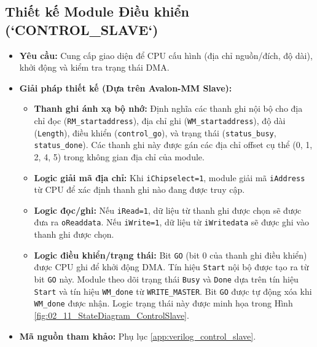 \subsection{Thiết kế Module Điều khiển (`CONTROL\_SLAVE`)}
\begin{itemize}
    \item \textbf{Yêu cầu:} Cung cấp giao diện để CPU cấu hình (địa chỉ nguồn/đích, độ dài), khởi động và kiểm tra trạng thái DMA.
    \item \textbf{Giải pháp thiết kế (Dựa trên Avalon-MM Slave):}
        \begin{itemize}
            \item \textbf{Thanh ghi ánh xạ bộ nhớ:} Định nghĩa các thanh ghi nội bộ cho địa chỉ đọc (\texttt{RM\_startaddress}), địa chỉ ghi (\texttt{WM\_startaddress}), độ dài (\texttt{Length}), điều khiển (\texttt{control\_go}), và trạng thái (\texttt{status\_busy}, \texttt{status\_done}). Các thanh ghi này được gán các địa chỉ offset cụ thể (0, 1, 2, 4, 5) trong không gian địa chỉ của module.
            \item \textbf{Logic giải mã địa chỉ:} Khi \texttt{iChipselect=1}, module giải mã \texttt{iAddress} từ CPU để xác định thanh ghi nào đang được truy cập.
            \item \textbf{Logic đọc/ghi:} Nếu \texttt{iRead=1}, dữ liệu từ thanh ghi được chọn sẽ được đưa ra \texttt{oReaddata}. Nếu \texttt{iWrite=1}, dữ liệu từ \texttt{iWritedata} sẽ được ghi vào thanh ghi được chọn.
            \item \textbf{Logic điều khiển/trạng thái:} Bit \texttt{GO} (bit 0 của thanh ghi điều khiển) được CPU ghi để khởi động DMA. Tín hiệu \texttt{Start} nội bộ được tạo ra từ bit \texttt{GO} này. Module theo dõi trạng thái \texttt{Busy} và \texttt{Done} dựa trên tín hiệu \texttt{Start} và tín hiệu \texttt{WM\_done} từ \texttt{WRITE\_MASTER}. Bit \texttt{GO} được tự động xóa khi \texttt{WM\_done} được nhận. Logic trạng thái này được minh họa trong Hình \ref{fig:02_11_StateDiagram_ControlSlave}.
        \end{itemize}
    \item \textbf{Mã nguồn tham khảo:} Phụ lục \ref{app:verilog_control_slave}.
\end{itemize}

